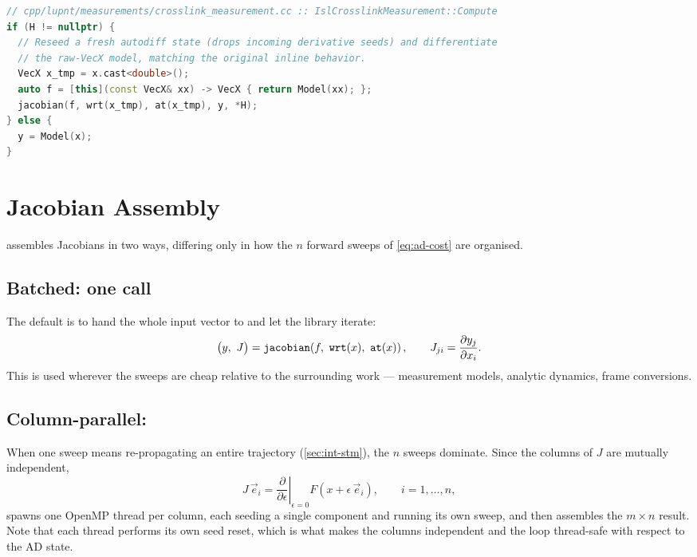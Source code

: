 \begin{lstlisting}[language=cpp, caption={Deliberate fresh re-seed that preserves the caller's derivative directions. Source: \code{cpp/lupnt/measurements/crosslink\_measurement.cc}}, label={lst:ad-isl}]
// cpp/lupnt/measurements/crosslink_measurement.cc :: IslCrosslinkMeasurement::Compute
if (H != nullptr) {
  // Reseed a fresh autodiff state (drops incoming derivative seeds) and differentiate
  // the raw-VecX model, matching the original inline behavior.
  VecX x_tmp = x.cast<double>();
  auto f = [this](const VecX& xx) -> VecX { return Model(xx); };
  jacobian(f, wrt(x_tmp), at(x_tmp), y, *H);
} else {
  y = Model(x);
}
\end{lstlisting}

\section{Jacobian Assembly}
\label{sec:ad-jacobian}

\lupnt{} assembles Jacobians in two ways, differing only in how the $n$
forward sweeps of \cref{eq:ad-cost} are organised.

\subsection{Batched: one  call}

The default is to hand the whole input vector to  and let the
library iterate:
\begin{equation}
  \label{eq:ad-batched}
  \big(y,\ J\big) = \code{jacobian}\!\left(f,\ \code{wrt}(x),\ \code{at}(x)\right),
  \qquad
  J_{ji} = \frac{\partial y_j}{\partial x_i}.
\end{equation}
This is used wherever the sweeps are cheap relative to the surrounding work
--- measurement models, analytic dynamics, frame conversions.

\subsection{Column-parallel: }
\label{sec:ad-jacparallel}

When one sweep means re-propagating an entire trajectory
(\cref{sec:int-stm}), the $n$ sweeps dominate. Since the columns of $J$ are
mutually independent,
\begin{equation}
  \label{eq:ad-col}
  J\,\vec{e}_i = \left.\frac{\partial}{\partial\epsilon}\right|_{\epsilon=0}
    F\!\left(x + \epsilon\,\vec{e}_i\right),
  \qquad i = 1,\dots,n,
\end{equation}
 spawns one OpenMP thread per column, each seeding a
single component  and running its own sweep, and then
assembles the $m\times n$ result. Note that each thread performs its own seed
reset, which is what makes the columns independent and the loop thread-safe
with respect to the AD state.

